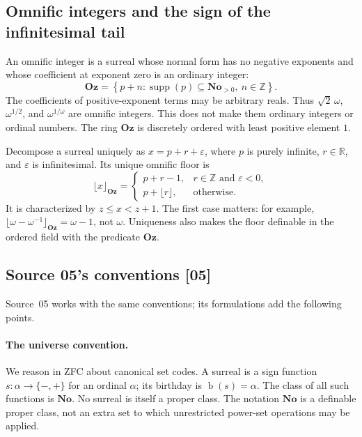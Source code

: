 \documentclass[11pt,a4paper]{article}
\numberwithin{equation}{section}
\theoremstyle{definition}
\theoremstyle{remark}
\newcommand{\No}{\mathbf{No}}
\newcommand{\Oz}{\mathbf{Oz}}
\newcommand{\Z}{\mathbb Z}
\newcommand{\R}{\mathbb R}
\newcommand{\bd}{\operatorname{b}}
\newcommand{\supp}{\operatorname{supp}}
\newcommand{\src}[1]{\textup{\textsf{\small[#1]}}}
\begin{document}
\subsection{Omnific integers and the sign of the infinitesimal tail}

An omnific integer is a surreal whose normal form has no negative
exponents and whose coefficient at exponent zero is an ordinary integer:
\begin{equation}\label{dsn:rp:eq:omnific}
 \Oz=\left\{p+n:\supp(p)\subseteq\No_{>0},\ n\in\Z\right\}.
\end{equation}
The coefficients of positive-exponent terms may be arbitrary reals. Thus
$\sqrt2\,\omega$, $\omega^{1/2}$, and $\omega^{1/\omega}$ are omnific
integers. This does not make them ordinary integers or ordinal numbers.
The ring $\Oz$ is discretely ordered with least positive element $1$.

Decompose a surreal uniquely as
$x=p+r+\varepsilon$, where $p$ is purely infinite, $r\in\R$, and
$\varepsilon$ is infinitesimal. Its unique omnific floor is
\begin{equation}\label{dsn:rp:eq:floor}
 \lfloor x\rfloor_{\Oz}=
 \begin{cases}
 p+r-1,&r\in\Z\text{ and }\varepsilon<0,\\
 p+\lfloor r\rfloor,&\text{otherwise}.
 \end{cases}
\end{equation}
It is characterized by $z\le x<z+1$. The first case matters: for example,
$\lfloor\omega-\omega^{-1}\rfloor_{\Oz}=\omega-1$, not $\omega$.
Uniqueness also makes the floor definable in the ordered field with the
predicate $\Oz$.


\subsection{Source 05's conventions \src{05}}
\label{dsn:ca:sec:foundations}

Source~05 works with the same conventions; its formulations add the
following points.

\paragraph{The universe convention.}

We reason in ZFC about canonical set codes. A surreal is a sign function
$s:\alpha\to\{-,+\}$ for an ordinal $\alpha$; its birthday is
$\bd(s)=\alpha$. The class of all such functions is $\No$. No surreal is
itself a proper class. The notation $\No$ is a definable proper class,
not an extra set to which unrestricted power-set operations may be
applied.
\end{document}
